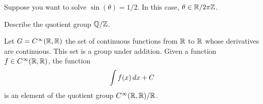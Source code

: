 \documentclass{ximera}
\begin{document}
\begin{example}
  Suppose you want to solve $\sin(\theta) = 1/2$. In this case,
  $\theta \in \mathbb R/2\pi\mathbb Z$.
\end{example}

\begin{exercise}
  Describe the quotient group $\mathbb Q/\mathbb Z$.
\end{exercise}

\begin{example}[Antiderivatives]
  Let $G= C^\infty(\mathbb R,\mathbb R)$ the set of continuous functions from $\mathbb R$
  to $\mathbb R$ whose derivatives are continuous. This set is a group under
  addition. Given a function $f\in C^\infty(\mathbb R,\mathbb R)$, the function
  \[
  \int f(x) \, d x + C
  \]
  is an element of the quotient group $C^\infty(\mathbb R,\mathbb R)/\mathbb R$.
\end{example}
\end{document}
